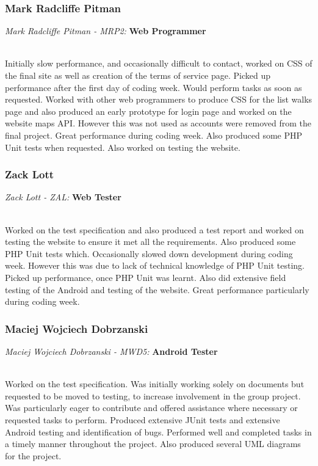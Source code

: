 \documentclass[12pt]{article}
\begin{document}
\subsubsection{Mark Radcliffe Pitman}
\centerline{\emph{Mark Radcliffe Pitman - MRP2:}\textbf{ Web Programmer}}
~\\
Initially slow performance, and occasionally difficult to contact, worked on CSS of the final site as well as creation of the terms of service page. Picked up performance after the first day of coding week. Would perform tasks as soon as requested. Worked with other web programmers to produce CSS for the list walks page and also produced an early prototype for login page and worked on the website maps API. However this was not used as accounts were removed from the final project. Great performance during coding week. Also produced some PHP Unit tests when requested. Also worked on testing the website.
\subsubsection{Zack Lott}
\centerline{\emph{Zack Lott - ZAL:}\textbf{ Web Tester}}
~\\
Worked on the test specification and also produced a test report and worked on testing the website to ensure it met all the requirements. Also produced some PHP Unit tests which. Occasionally slowed down development during coding week. However this was due to lack of technical knowledge of PHP Unit testing. Picked up performance, once PHP Unit was learnt. Also did extensive field testing of the Android and testing of the website. Great performance particularly during coding week.
\subsubsection{Maciej Wojciech Dobrzanski}
\centerline{\emph{Maciej Wojciech Dobrzanski - MWD5:}\textbf{ Android Tester}}
~\\
Worked on the test specification. Was initially working solely on documents but requested to be moved to testing, to increase involvement in the group project. Was particularly eager to contribute and offered assistance where necessary or requested tasks to perform. Produced extensive JUnit tests and extensive Android testing and identification of bugs. Performed well and completed tasks in a timely manner throughout the project. Also produced several UML diagrams for the project. 
\newpage
\end{document}
